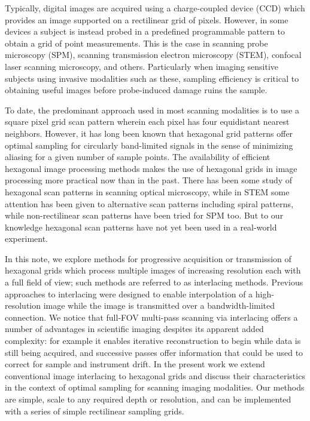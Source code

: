 \documentclass[aip, amsmath, amssymb, nobibnotes, nofootinbib, citeautoscript, reprint, superscriptaddress]{revtex4-1}
\begin{document}
    Typically, digital images are acquired using a charge-coupled device (CCD) which provides an image supported on a rectilinear grid of pixels.
    However, in some devices a subject is instead probed in a predefined programmable pattern to obtain a grid of point measurements.
    This is the case in scanning probe microscopy (SPM), scanning transmission electron microscopy (STEM), confocal laser scanning microscopy, and others.
    Particularly when imaging sensitive subjects using invasive modalities such as
    these, sampling efficiency is critical to obtaining useful images before probe-induced damage ruins the sample.


    To date, the predominant approach used in most scanning modalities is to use a square pixel grid scan pattern wherein each pixel has four equidistant nearest neighbors.
    However, it has long been known that hexagonal grid patterns offer optimal sampling for circularly band-limited signals in the sense of minimizing aliasing for a given number of sample points\cite{petersen1962}.
    The availability of efficient hexagonal image processing methods makes the use
    of hexagonal grids in image processing more practical now than in the past\cite{birdsong2016hexfft,middleton2006hexagonal}.
    There has been some study of hexagonal scan patterns in scanning optical
    microscopy\cite{heintzmann2007}, while in STEM some attention has been given to alternative scan patterns including spiral patterns\cite{sang2016dynamic}, while non-rectilinear scan patterns have been tried for SPM too\cite{ziegler2013improved}. 
    But to our knowledge hexagonal scan patterns have not yet been used in a real-world experiment. 


    In this note, we explore methods for progressive acquisition or transmission of hexagonal grids which process multiple images of increasing resolution each with a full field of view; such methods are referred to as interlacing methods.
    Previous approaches to interlacing were designed to enable interpolation of a
    high-resolution image while the image is transmitted over a bandwidth-limited connection.
    We notice that full-FOV multi-pass scanning via interlacing offers a number of
    advantages in scientific imaging despites its apparent added complexity: for
    example it enables iterative reconstruction to begin while data is still being
    acquired, and successive passes offer information that could be used to correct
    for sample and instrument drift.
    In the present work we extend conventional image interlacing to hexagonal grids and discuss their characteristics in the context of optimal sampling for scanning imaging modalities.
    Our methods are simple, scale to any required depth or resolution, and can be
    implemented with a series of simple rectilinear sampling grids.
\end{document}
